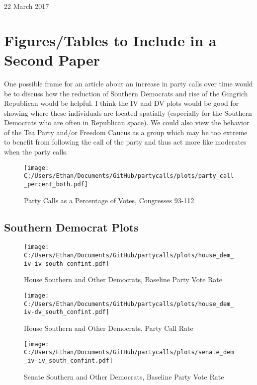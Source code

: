 \documentclass[12pt]{article}
\begin{document}
	
\begin{center}
	\Large 22 March 2017
\end{center}

\section*{Figures/Tables to Include in a Second Paper}

One possible frame for an article about an increase in party calls over time would be to discuss how the reduction of Southern Democrats and rise of the Gingrich Republican would be helpful. I think the IV and DV plots would be good for showing where these individuals are located spatially (especially for the Southern Democrats who are often in Republican space). We could also view the behavior of the Tea Party and/or Freedom Caucus as a group which may be too extreme to benefit from following the call of the party and thus act more like moderates when the party calls.

\begin{figure}[H]
	\centering
	\caption{Party Calls as a Percentage of Votes, Congresses 93-112}
	\texttt{[image: C:/Users/Ethan/Documents/GitHub/partycalls/plots/party\_call\_percent\_both.pdf]}
\end{figure}

\subsection{Southern Democrat Plots}

\begin{figure}[H]
	\centering
	\caption{House Southern and Other Democrats, Baseline Party Vote Rate}
	\texttt{[image: C:/Users/Ethan/Documents/GitHub/partycalls/plots/house\_dem\_iv-iv\_south\_confint.pdf]}
\end{figure}

\begin{figure}[H]
	\centering
	\caption{House Southern and Other Democrats, Party Call Rate}
	\texttt{[image: C:/Users/Ethan/Documents/GitHub/partycalls/plots/house\_dem\_iv-dv\_south\_confint.pdf]}
\end{figure}

\begin{figure}[H]
	\centering
	\caption{Senate Southern and Other Democrats, Baseline Party Vote Rate}
	\texttt{[image: C:/Users/Ethan/Documents/GitHub/partycalls/plots/senate\_dem\_iv-iv\_south\_confint.pdf]}
\end{figure}
\end{document}
